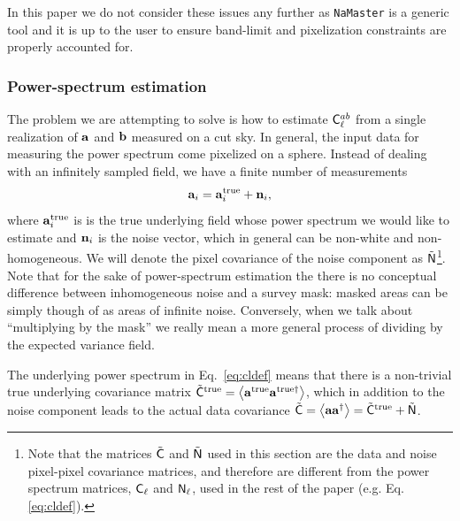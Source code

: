 \documentclass[usenatbib]{mnrasb}
\newcommand{\nmt}{{\tt NaMaster}}
\newcommand{\va}{{\mathbf{a}}}
\begin{document}
      In this paper we do not consider these issues any further as \nmt
      is a generic tool and it is up to the user to ensure band-limit
      and pixelization constraints are properly accounted for.
      


      \subsubsection{Power-spectrum estimation}
        The problem we are attempting to solve is how to estimate ${\sf C}^{ab}_\ell$ from a single realization of ${\bf a}$ and ${\bf b}$ measured on a cut sky. In general, the input data for measuring the power spectrum come pixelized on a sphere. Instead of dealing with an infinitely sampled field, we have a finite number of measurements
        \begin{equation}
          \va_i = \va_i^{\rm true} + {\bf n}_i,
        \end{equation}
        where $\va_i^{\rm true}$ is is the true underlying field whose power spectrum we would like to estimate and ${\bf n}_i$ is the noise vector, which in general can be non-white and non-homogeneous. We will denote the pixel covariance of the noise component as $\tilde{\sf N}$\footnote{Note that the matrices $\tilde{\sf C}$ and $\tilde{\sf N}$ used in this section are the data and noise pixel-pixel covariance matrices, and therefore are different from the power spectrum matrices, ${\sf C}_\ell$ and ${\sf N}_\ell$, used in the rest of the paper (e.g. Eq. \ref{eq:cldef}).}. Note that for the sake of power-spectrum estimation the there is no conceptual difference between inhomogeneous noise and a survey mask: masked areas can be simply though of as areas of infinite noise. Conversely, when we talk about ``multiplying by the mask'' we really mean a more general process of dividing by the expected variance field.

        The underlying power spectrum in Eq.~\ref{eq:cldef} means that there is a non-trivial true underlying covariance matrix $\tilde{\sf C}^{\rm true} = \left<\va^{\rm true} \va^{{\rm true}\dagger}\right>$, which in addition to the noise component leads to the actual data covariance $\tilde{\sf C} = \left<\va \va^\dagger\right>=\tilde{\sf C}^{\rm true} + \tilde{\sf N}$.
\end{document}
